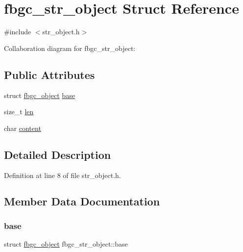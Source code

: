 \hypertarget{structfbgc__str__object}{}\section{fbgc\+\_\+str\+\_\+object Struct Reference}
\label{structfbgc__str__object}


{\ttfamily \#include $<$str\+\_\+object.\+h$>$}



Collaboration diagram for fbgc\+\_\+str\+\_\+object\+:
\subsection*{Public Attributes}
\begin{DoxyCompactItemize}
\item 
struct \hyperlink{structfbgc__object}{fbgc\+\_\+object} \hyperlink{structfbgc__str__object_ac5135334a1ebe9b47cfa2fb7fad772d4}{base}
\item 
size\+\_\+t \hyperlink{structfbgc__str__object_a6bcd23323579e758b1d497200d15f5bc}{len}
\item 
char \hyperlink{structfbgc__str__object_af2e138bcfc159a80d8fa686d4aa45791}{content}
\end{DoxyCompactItemize}


\subsection{Detailed Description}


Definition at line 8 of file str\+\_\+object.\+h.



\subsection{Member Data Documentation}
\mbox{\label{structfbgc__str__object_ac5135334a1ebe9b47cfa2fb7fad772d4}} 
\subsubsection{\texorpdfstring{base}{base}}
{\footnotesize\ttfamily struct \hyperlink{structfbgc__object}{fbgc\+\_\+object} fbgc\+\_\+str\+\_\+object\+::base}



